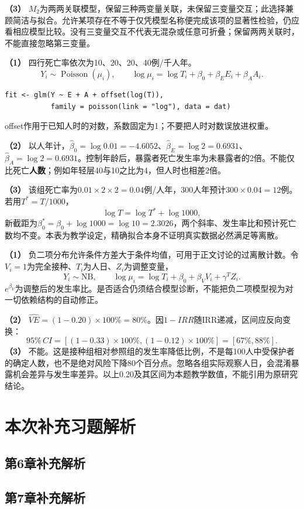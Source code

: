 \textbf{（3）} \(M_2\)为两两关联模型，保留三种两变量关联，未保留三变量交互；此选择兼顾简洁与拟合。允许某项存在不等于仅凭模型名称便完成该项的显著性检验，仍应看相应模型比较。没有三变量交互不代表无混杂或任意可折叠；保留两两关联时，不能直接忽略第三变量。




\textbf{（1）} 四行死亡率依次为10、20、20、40例/千人年。
\[Y_i\sim\operatorname{Poisson}(\mu_i),\qquad
\log\mu_i=\log T_i+\beta_0+\beta_EE_i+\beta_AA_i.\]
\begin{verbatim}
fit <- glm(Y ~ E + A + offset(log(T)),
           family = poisson(link = "log"), data = dat)
\end{verbatim}
offset作用于已知人时的对数，系数固定为1；不要把人时对数误放进权重。

\textbf{（2）} 以人年计，\(\hat\beta_0=\log0.01=-4.6052\)、\(\hat\beta_E=\log2=0.6931\)、\(\hat\beta_A=\log2=0.6931\)。控制年龄后，暴露者死亡发生率为未暴露者的2倍。不能仅比死亡\textbf{人数}；例如年轻层40与10之比为4，但人时也相差2倍。

\textbf{（3）} 该组死亡率为\(0.01\times2\times2=0.04\)例/人年，300人年预计\(300\times0.04=12\)例。若用\(T^*=T/1000\)，
\[\log T=\log T^*+\log1000,\]
新截距为\(\beta_0^*=\beta_0+\log1000=\log10=2.3026\)，两个斜率、发生率比和预计死亡数均不变。本表为教学设定，精确拟合本身不证明真实数据必然满足等离散。




\textbf{（1）} 负二项分布允许条件方差大于条件均值，可用于正文讨论的过离散计数。令\(V_i=1\)为完全接种、\(T_i\)为人日、\(Z_i\)为调整变量，
\[Y_i\sim\mathrm{NB},\qquad
\log\mu_i=\log T_i+\beta_0+\beta_VV_i+\gamma^TZ_i.\]
\(e^{\beta_V}\)为调整后的发生率比。是否适合仍须结合模型诊断，不能把负二项模型视为对一切依赖结构的自动修正。

\textbf{（2）} \(\widehat{VE}=(1-0.20)\times100\%=80\%\)。因\(1-IRR\)随IRR递减，区间应反向变换：
\[95\%\,CI=[(1-0.33)\times100\%,(1-0.12)\times100\%]
=[67\%,88\%].\]
\textbf{（3）} 不能。这是接种组相对参照组的发生率降低比例，不是每100人中受保护者的确定人数，也不是绝对风险下降80个百分点。忽略各组实际观察人日，会混淆暴露机会差异与发生率差异。以上0.20及其区间为本题教学数值，不能引用为原研究结论。
\clearpage\section{本次补充习题解析}
\subsection*{第6章补充解析}

\subsection*{第7章补充解析}

\EndExercises
